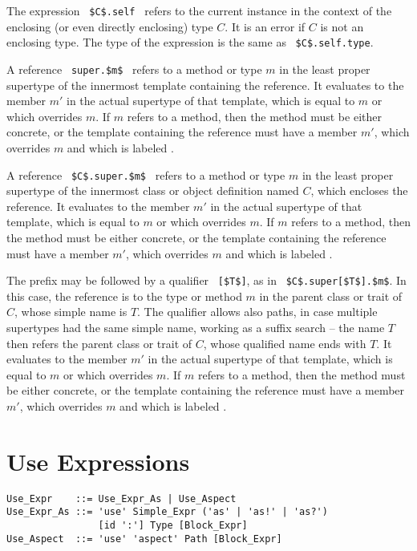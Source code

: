 The expression ~\lstinline!$C$.self!~ refers to the current instance in the context of the enclosing (or even directly enclosing) type $C$. It is an error if $C$ is not an enclosing type. The type of the expression is the same as ~\lstinline!$C$.self.type!. 

A reference ~\lstinline!super.$m$!~ refers to a method or type $m$ in the least proper supertype of the innermost template containing the reference. It evaluates to the member $m'$ in the actual supertype of that template, which is equal to $m$ or which overrides $m$. If $m$ refers to a method, then the method must be either concrete, or the template containing the reference must have a member $m'$, which overrides $m$ and which is labeled . 

A reference ~\lstinline!$C$.super.$m$!~ refers to a method or type $m$ in the least proper supertype of the innermost class or object definition named $C$, which encloses the reference. It evaluates to the member $m'$ in the actual supertype of that template, which is equal to $m$ or which overrides $m$. If $m$ refers to a method, then the method must be either concrete, or the template containing the reference must have a member $m'$, which overrides $m$ and which is labeled . 

The  prefix may be followed by a qualifier ~\lstinline![$T$]!, as in ~\lstinline!$C$.super[$T$].$m$!. In this case, the reference is to the type or method $m$ in the parent class or trait of $C$, whose simple name is $T$. The qualifier allows also paths, in case multiple supertypes had the same simple name, working as a suffix search -- the name $T$ then refers the parent class or trait of $C$, whose qualified name ends with $T$. It evaluates to the member $m'$ in the actual supertype of that template, which is equal to $m$ or which overrides $m$. If $m$ refers to a method, then the method must be either concrete, or the template containing the reference must have a member $m'$, which overrides $m$ and which is labeled . 






\section{Use Expressions}
\label{sec:use-expressions}

\syntax\begin{lstlisting}
Use_Expr    ::= Use_Expr_As | Use_Aspect
Use_Expr_As ::= 'use' Simple_Expr ('as' | 'as!' | 'as?')
                [id ':'] Type [Block_Expr]
Use_Aspect  ::= 'use' 'aspect' Path [Block_Expr]
\end{lstlisting}

